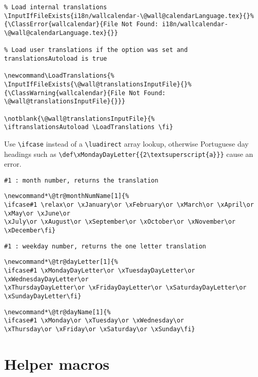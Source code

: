 \documentclass[11pt,oneside]{memoir-article}
\begin{document}
\begin{verbatim}
% Load internal translations
\InputIfFileExists{i18n/wallcalendar-\@wall@calendarLanguage.tex}{}%
{\ClassError{wallcalendar}{File Not Found: i18n/wallcalendar-\@wall@calendarLanguage.tex}{}}

% Load user translations if the option was set and translationsAutoload is true

\newcommand\LoadTranslations{%
\InputIfFileExists{\@wall@translationsInputFile}{}%
{\ClassWarning{wallcalendar}{File Not Found: \@wall@translationsInputFile}{}}}

\notblank{\@wall@translationsInputFile}{%
\iftranslationsAutoload \LoadTranslations \fi}
\end{verbatim}

Use \texttt{\textbackslash{}ifcase} instead of a \texttt{\textbackslash{}luadirect} array lookup, otherwise Portuguese day
headings such as \texttt{\textbackslash{}def\textbackslash{}xMondayDayLetter\{\{2\textbackslash{}textsuperscript\{a\}\}\}} cause an error.

\begin{verbatim}
#1 : month number, returns the translation
\end{verbatim}


\begin{verbatim}
\newcommand*\@tr@monthNumName[1]{%
\ifcase#1 \relax\or \xJanuary\or \xFebruary\or \xMarch\or \xApril\or \xMay\or \xJune\or
\xJuly\or \xAugust\or \xSeptember\or \xOctober\or \xNovember\or \xDecember\fi}
\end{verbatim}

\begin{verbatim}
#1 : weekday number, returns the one letter translation 
\end{verbatim}


\begin{verbatim}
\newcommand*\@tr@dayLetter[1]{%
\ifcase#1 \xMondayDayLetter\or \xTuesdayDayLetter\or \xWednesdayDayLetter\or
\xThursdayDayLetter\or \xFridayDayLetter\or \xSaturdayDayLetter\or \xSundayDayLetter\fi}
\end{verbatim}

\begin{verbatim}
\newcommand*\@tr@dayName[1]{%
\ifcase#1 \xMonday\or \xTuesday\or \xWednesday\or
\xThursday\or \xFriday\or \xSaturday\or \xSunday\fi}
\end{verbatim}

\chapter{Helper macros}
\label{sec:org43a83b1}
\end{document}
